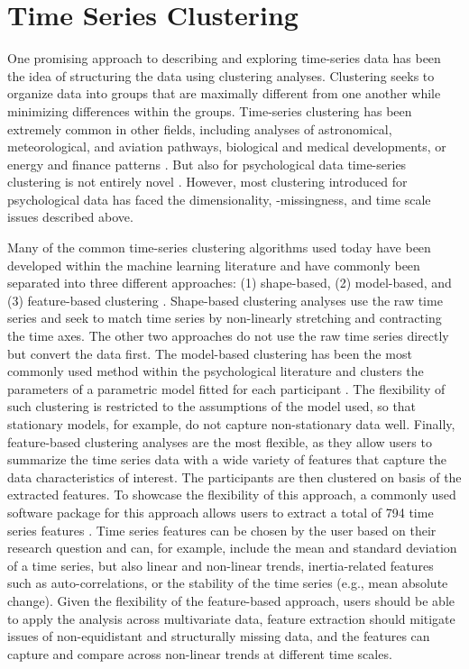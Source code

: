 \documentclass[man, 12pt, a4paper]{apa7}
\theoremstyle{break}
\theoremstyle{plain}
\begin{document}
\section{Time Series Clustering}
One promising approach to describing and exploring time-series data has been the idea of structuring the data using clustering analyses. Clustering seeks to organize data into groups that are maximally different from one another while minimizing differences within the groups. Time-series clustering has been extremely common in other fields, including analyses of astronomical, meteorological, and aviation pathways, biological and medical developments, or energy and finance patterns \citep{Aghabozorgi2015}. But also for psychological data time-series clustering is not entirely novel \citep[e.g.,][]{ernst2021}. However, most clustering introduced for psychological data has faced the dimensionality, -missingness, and time scale issues described above.

Many of the common time-series clustering algorithms used today have been developed within the machine learning literature and have commonly been separated into three different approaches: (1) shape-based, (2) model-based, and (3) feature-based clustering \citep{hautamaki2008, liao2005}. Shape-based clustering analyses use the raw time series and seek to match time series by non-linearly stretching and contracting the time axes. The other two approaches do not use the raw time series directly but convert the data first. The model-based clustering has been the most commonly used method within the psychological literature and clusters the parameters of a parametric model fitted for each participant \citep[e.g.,][]{ernst2021}. The flexibility of such clustering is restricted to the assumptions of the model used, so that stationary models, for example, do not capture non-stationary data well. Finally, feature-based clustering analyses are the most flexible, as they allow users to summarize the time series data with a wide variety of features that capture the data characteristics of interest. The participants are then clustered on basis of the extracted features. To showcase the flexibility of this approach, a commonly used software package for this approach allows users to extract a total of 794 time series features \citep[][]{christ2018}. Time series features can be chosen by the user based on their research question and can, for example, include the mean and standard deviation of a time series, but also linear and non-linear trends, inertia-related features such as auto-correlations, or the stability of the time series (e.g., mean absolute change). Given the flexibility of the feature-based approach, users should be able to apply the analysis across multivariate data, feature extraction should mitigate issues of non-equidistant and structurally missing data, and the features can capture and compare across non-linear trends at different time scales.
\end{document}
